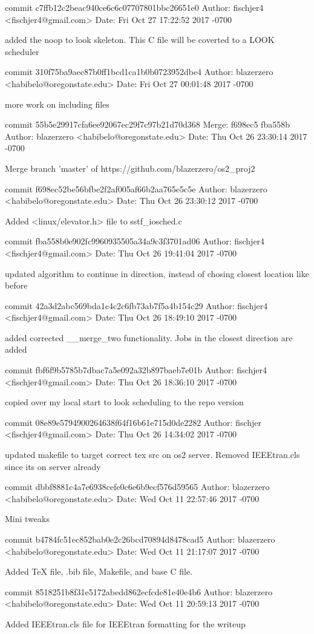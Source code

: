 commit c7ffb12c2beac940ce6c6c07707801bbc26651e0
Author: fischjer4 <fischjer4@gmail.com>
Date:   Fri Oct 27 17:22:52 2017 -0700

    added the noop to look skeleton. This C file will be coverted to a LOOK scheduler

commit 310f75ba9aec87b0ff1bcd1ca1b0b0723952dbe4
Author: blazerzero <habibelo@oregonstate.edu>
Date:   Fri Oct 27 00:01:48 2017 -0700

    more work on including files

commit 55b5e29917cfa6ee92067ec29f7c97b21d70d368
Merge: f698ec5 fba558b
Author: blazerzero <habibelo@oregonstate.edu>
Date:   Thu Oct 26 23:30:14 2017 -0700

    Merge branch 'master' of https://github.com/blazerzero/os2_proj2

commit f698ec52be56bfbe2f2af005af66b2aa765e5c5e
Author: blazerzero <habibelo@oregonstate.edu>
Date:   Thu Oct 26 23:30:12 2017 -0700

    Added <linux/elevator.h> file to sstf_iosched.c

commit fba558b0e902fc9960935505a34a9c3f3701ad06
Author: fischjer4 <fischjer4@gmail.com>
Date:   Thu Oct 26 19:41:04 2017 -0700

    updated algorithm to continue in direction, instead of chosing closest location like before

commit 42a3d2abc569bda1c4c2c6fb73ab7f5a4b154c29
Author: fischjer4 <fischjer4@gmail.com>
Date:   Thu Oct 26 18:49:10 2017 -0700

    added corrected __merge_two functionality. Jobs in the closest direction are added

commit fbf6f9b5785b7dbac7a5e092a32b897baeb7e01b
Author: fischjer4 <fischjer4@gmail.com>
Date:   Thu Oct 26 18:36:10 2017 -0700

    copied over my local start to look scheduling to the repo version

commit 08e89e5794900264638f64f16b61e715d0de2282
Author: fischjer <fischjer4@gmail.com>
Date:   Thu Oct 26 14:34:02 2017 -0700

    updated makefile to target correct tex src on os2 server. Removed IEEEtran.cls since its on server already

commit dbbf8881c4a7e6938cefe0c6e6b9ecf576d59565
Author: blazerzero <habibelo@oregonstate.edu>
Date:   Wed Oct 11 22:57:46 2017 -0700

    Mini tweaks

commit b4784fc51ec852bab0e2c26bcd70894d8478cad5
Author: blazerzero <habibelo@oregonstate.edu>
Date:   Wed Oct 11 21:17:07 2017 -0700

    Added TeX file, .bib file, Makefile, and base C file.

commit 8518251b8f31e5172abedd862ecfcde81e40e4b6
Author: blazerzero <habibelo@oregonstate.edu>
Date:   Wed Oct 11 20:59:13 2017 -0700

    Added IEEEtran.cls file for IEEEtran formatting for the writeup
